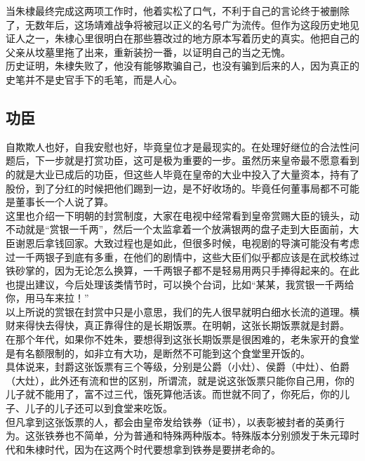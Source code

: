 \begin{multicols}{\theparacolNo}
当朱棣最终完成这两项工作时，他着实松了口气，不利于自己的言论终于被删除了，无数年后，这场靖难战争将被冠以正义的名号广为流传。但作为这段历史地见证人之一，朱棣心里很明白在那些篡改过的地方原本写着历史的真实。他把自己的父亲从坟墓里拖了出来，重新装扮一番，以证明自己的当之无愧。\\

历史证明，朱棣失败了，他没有能够欺骗自己，也没有骗到后来的人，因为真正的史笔并不是史官手下的毛笔，而是人心。\\

\subsection{功臣}
自欺欺人也好，自我安慰也好，毕竟皇位才是最现实的。在处理好继位的合法性问题后，下一步就是打赏功臣，这可是极为重要的一步。虽然历来皇帝最不愿意看到的就是大业已成后的功臣，但这些人毕竟在皇帝的大业中投入了大量资本，持有了股份，到了分红的时候把他们踢到一边，是不好收场的。毕竟任何董事局都不可能是董事长一个人说了算。\\

这里也介绍一下明朝的封赏制度，大家在电视中经常看到皇帝赏赐大臣的镜头，动不动就是“赏银一千两”，然后一个太监拿着一个放满银两的盘子走到大臣面前，大臣谢恩后拿钱回家。大致过程也是如此，但很多时候，电视剧的导演可能没有考虑过一千两银子到底有多重，在他们的剧情中，这些大臣们似乎都应该是在武校练过铁砂掌的，因为无论怎么换算，一千两银子都不是轻易用两只手捧得起来的。在此也提出建议，今后处理该类情节时，可以换个台词，比如“某某，我赏银一千两给你，用马车来拉！”\\

以上所说的赏银在封赏中只是小意思，我们的先人很早就明白细水长流的道理。横财来得快去得快，真正靠得住的是长期饭票。在明朝，这张长期饭票就是封爵。\\

在那个年代，如果你不姓朱，要想得到这张长期饭票是很困难的，老朱家开的食堂是有名额限制的，如非立有大功，是断然不可能到这个食堂里开饭的。\\

具体说来，封爵这张饭票有三个等级，分别是公爵（小灶）、侯爵（中灶）、伯爵（大灶），此外还有流和世的区别，所谓流，就是说这张饭票只能你自己用，你的儿子就不能用了，富不过三代，饿死算他活该。而世就不同了，你死后，你的儿子、儿子的儿子还可以到食堂来吃饭。\\

但凡拿到这张饭票的人，都会由皇帝发给铁券（证书），以表彰被封者的英勇行为。这张铁券也不简单，分为普通和特殊两种版本。特殊版本分别颁发于朱元璋时代和朱棣时代，因为在这两个时代要想拿到铁券是要拼老命的。\\


\end{multicols}
